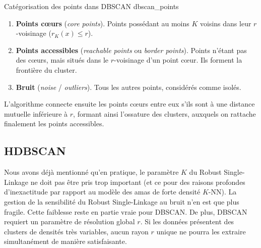\begin{Definition}{Catégorisation des points dans DBSCAN \cite{DBSCAN}}{dbscan_points}
\begin{enumerate}
    \item \textbf{Points cœurs} (\emph{core points}). Points possédant au moins $K$ voisins dans leur $r$-voisinage ($r_{K}(x) \le r$).
    \item \textbf{Points accessibles} (\emph{reachable points} ou \emph{border points}). Points n'étant pas des cœurs, mais situés dans le $r$-voisinage d'un point cœur. Ils forment la frontière du cluster.
    \item \textbf{Bruit} (\emph{noise} / \emph{outliers}). Tous les autres points, considérés comme isolés.
\end{enumerate}
\end{Definition}

L'algorithme connecte ensuite les points cœurs entre eux s'ils sont à une distance mutuelle inférieure à $r$, formant ainsi l'ossature des clusters, auxquels on rattache finalement les points accessibles.


\subsection{HDBSCAN}

Nous avons déjà mentionné qu'en pratique, le paramètre $K$ du Robust Single-Linkage ne doit pas être pris trop important (et ce pour des raisons profondes d'inexactitude par rapport au modèle des amas de forte densité $K$-NN).
La gestion de la sensibilité du Robust Single-Linkage au bruit n'en est que plus fragile.
Cette faiblesse reste en partie vraie pour DBSCAN. De plus, DBSCAN requiert un paramètre de résolution global $r$. Si les données présentent des clusters de densités très variables, aucun rayon $r$ unique ne pourra les extraire simultanément de manière satisfaisante.


